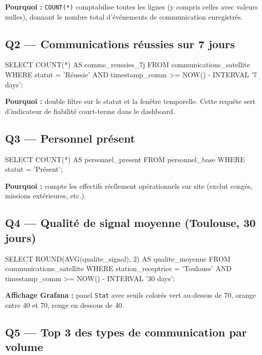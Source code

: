 \documentclass[11pt,a4paper]{article}
\begin{document}
\textbf{Pourquoi :} \texttt{COUNT(*)} comptabilise toutes les lignes (y compris celles avec valeurs nulles), donnant le nombre total d'événements de communication enregistrés.

\subsection{Q2 — Communications réussies sur 7 jours}

\begin{sqlbox}
SELECT COUNT(*) AS comms_reussies_7j
FROM communications_satellite
WHERE statut = 'Réussie'
  AND timestamp_comm >= NOW() - INTERVAL '7 days';
\end{sqlbox}

\textbf{Pourquoi :} double filtre sur le statut et la fenêtre temporelle. Cette requête sert d'indicateur de fiabilité court-terme dans le dashboard.

\subsection{Q3 — Personnel présent}

\begin{sqlbox}
SELECT COUNT(*) AS personnel_present
FROM personnel_base
WHERE statut = 'Présent';
\end{sqlbox}

\textbf{Pourquoi :} compte les effectifs réellement opérationnels sur site (exclut congés, missions extérieures, etc.).

\subsection{Q4 — Qualité de signal moyenne (Toulouse, 30 jours)}

\begin{sqlbox}
SELECT ROUND(AVG(qualite_signal), 2) AS qualite_moyenne
FROM communications_satellite
WHERE station_receptrice = 'Toulouse'
  AND timestamp_comm >= NOW() - INTERVAL '30 days';
\end{sqlbox}

\textbf{Affichage Grafana :} panel \texttt{Stat} avec seuils colorés \textemdash{} vert au-dessus de 70, orange entre 40 et 70, rouge en dessous de 40.

\subsection{Q5 — Top 3 des types de communication par volume}
\end{document}
